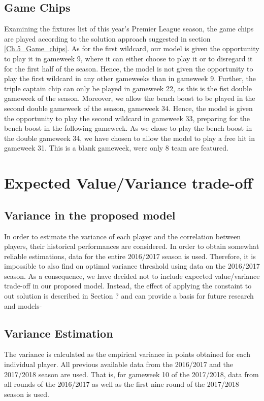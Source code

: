 \subsection{Game Chips}
Examining the fixtures list of this year's Premier League season, the game chips are played according to the solution approach suggested in section \ref{Ch.5_Game_chips}. As for the first wildcard, our model is given the opportunity to play it in gameweek 9, where it can either choose to play it or to disregard it for the first half of the season. Hence, the model is not given the opportunity to play the first wildcard in any other gameweeks than in gameweek 9. Further, the triple captain chip can only be played in gameweek 22, as this is the fist double gameweek of the season. Moreover, we allow the bench boost to be played in the second double gameweek of the season, gameweek 34. Hence, the model is given the opportunity to play the second wildcard in gameweek 33, preparing for the bench boost in the following gameweek. As we chose to play the bench boost in the double gameweek 34, we have chosen to allow the model to play a free hit in gameweek 31. This is a blank gameweek, were only 8 team are featured.


\section{Expected Value/Variance trade-off}

\subsection{Variance in the proposed model}

In order to estimate the variance of each player and the correlation between players, their historical performances are considered. In order to obtain somewhat reliable estimations, data for the entire 2016/2017 season is used. Therefore, it is impossible to also find on optimal variance threshold using data on the 2016/2017 season. As a consequence, we have decided not to include expected value/variance trade-off in our proposed model. Instead, the effect of applying the constaint to out solution is described in Section ? and can provide a basis for future research and models-

\subsection{Variance Estimation}
The variance is calculated as the empirical variance in points obtained for each individual player. All previous available data from the 2016/2017 and the 2017/2018 season are used. That is, for gameweek 10 of the 2017/2018, data from all rounds of the 2016/2017 as well as the first nine round of the 2017/2018 season is used.\newpar

